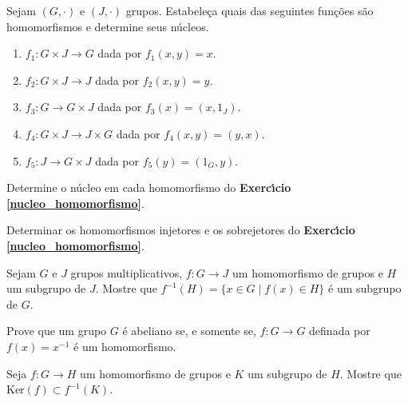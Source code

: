 \documentclass[12pt]{exam}
\begin{document}
    \vspace{.3cm}

    \questao{} Sejam $(G, \cdot)$ e $(J, \cdot)$ grupos. Estabele\c{c}a quais das seguintes fun\c{c}\~oes s\~ao homomorfismos e determine seus n\'ucleos.

    \begin{enumerate}[label=({\alph*})]
      \item $f_1 : G \times J \to G$ dada por $f_1(x,y) = x$.

      \item $f_2 : G \times J \to J$ dada por $f_2(x,y) = y$.

      \item $f_3 : G  \to G \times J$ dada por $f_3(x) = (x, 1_J)$.

      \item $f_4 : G \times J \to J \times G$ dada por $f_4(x,y) = (y, x)$.

      \item $f_5 : J \to G \times J$ dada por $f_5(y) = (1_G, y)$.
    \end{enumerate}

    \vspace{.3cm}

    \questao{} Determine o n\'ucleo em cada homomorfismo do \textbf{Exerc{\'\i}cio \ref{nucleo_homomorfismo}}.

    \vspace{.3cm}

    \questao{} Determinar os homomorfismos injetores e os sobrejetores do \textbf{Exerc{\'\i}cio \ref{nucleo_homomorfismo}}.

    \vspace{.3cm}

    \questao{} Sejam $G$ e $J$ grupos multiplicativos, $f : G \to J$ um homomorfismo de grupos e $H$ um subgrupo de $J$. Mostre que $f^{-1}(H) = \{ x \in G \mid f(x) \in H\}$ {\'e} um subgrupo de $G$.

    \vspace{.3cm}

    \questao{} Prove que um grupo $G$ {\'e} abeliano se, e somente se, $f : G \to G$ definada por $f(x) = x^{-1}$ {\'e} um homomorfismo.

    \vspace{.3cm}

    \questao{} Seja $f: G\to H$ um homomorfismo de grupos e $K$ um subgrupo de $H$. Mostre que Ker$(f)\subset f^{-1}(K)$.

    \vspace{.3cm}
\end{document}

